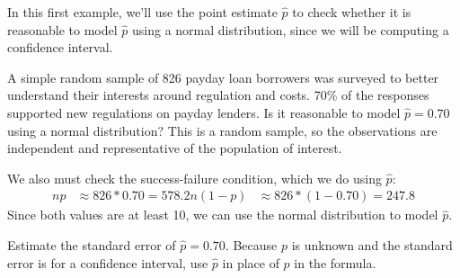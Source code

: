 
In this first example, we'll use the point estimate
$\hat{p}$ to check whether it is reasonable to model
$\hat{p}$ using a normal distribution,
since we will be computing a confidence interval.


\newcommand{\paydayN}{826}
\newcommand{\paydayNHalf}{413}
\newcommand{\paydayRegPerc}{70\%}
\newcommand{\paydayRegProp}{0.70}
\newcommand{\paydayRegSE}{0.016}
\newcommand{\paydayRegSEPerc}{1.6\%}
\newcommand{\paydayRegLower}{0.669}
\newcommand{\paydayRegUpper}{0.731}
\newcommand{\paydayRegLowerPerc}{66.9\%}
\newcommand{\paydayRegUpperPerc}{73.1\%}

\begin{examplewrap}
\begin{nexample}{A simple random sample of \paydayN{}
    payday loan borrowers was surveyed to better
    understand their interests around regulation and costs.
    \paydayRegPerc{} of the responses supported new
    regulations on payday lenders.
    Is it reasonable to model $\hat{p} = \paydayRegProp{}$
    using a normal distribution?}
  This is a random sample, so the observations are
  independent and representative of the population of interest.

  We also must check the success-failure condition,
  which we do using $\hat{p}$:
  \begin{align*}
  n p & \approx \paydayN{} * \paydayRegProp{} = 578.2
  n (1 - p) & \approx \paydayN{} * (1 - \paydayRegProp{}) = 247.8
  \end{align*}
  Since both values are at least 10, we can use the normal
  distribution to model $\hat{p}$.
\end{nexample}
\end{examplewrap}


\begin{exercisewrap}
\begin{nexercise} \label{seOfPropOfPDBorrowersSupportReg}
Estimate the standard error of $\hat{p} = \paydayRegProp{}$.
Because $p$ is unknown and the standard error is for
a confidence interval, use $\hat{p}$ in place of $p$
in the formula.\footnotemark
\end{nexercise}
\end{exercisewrap}
\footnotetext{$SE = \sqrt{\frac{p(1-p)}{n}} \approx
    \sqrt{\frac{\paydayRegProp{} (1 - \paydayRegProp{})}
        {\paydayN{}}} = \paydayRegSE{}$.}

